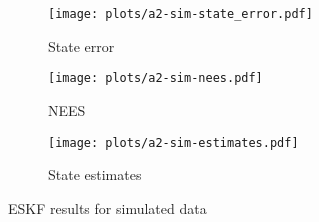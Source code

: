 


\begin{figure}
    \centering
    \begin{subfigure}{0.49\textwidth}
        \texttt{[image: plots/a2-sim-state\_error.pdf]} 
        \caption{State error}
        \label{fig:eskf-sim-state-error}
    \end{subfigure}
    \hfill
    \begin{subfigure}{0.49\textwidth}
        \texttt{[image: plots/a2-sim-nees.pdf]} 
        \caption{NEES}
        \label{fig:eskf-sim-nees}
    \end{subfigure}
    \hfill
    \begin{subfigure}{0.50\textwidth}
        \texttt{[image: plots/a2-sim-estimates.pdf]} 
        \caption{State estimates}
        \label{fig:a2-sim-estimates}
    \end{subfigure}

    \caption{ESKF results for simulated data}
    \label{fig:eskf-sim-error-NEES}
\end{figure}



